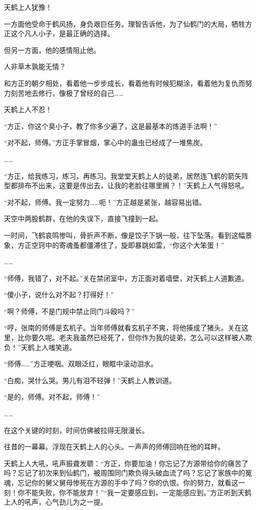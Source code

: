 
\begin{this_body}

天鹤上人犹豫！

一方面他受命于鹤风扬，身负艰巨任务。理智告诉他，为了仙鹤门的大局，牺牲方正这个凡人小子，是最正确的选择。

但另一方面，他的感情阻止他。

人非草木孰能无情？

和方正的朝夕相处，看着他一步步成长，看着他有时候犯糊涂，看着他为复仇而努力刻苦地去修行，像极了曾经的自己……

天鹤上人不忍！

“方正，你这个臭小子，教了你多少遍了，这是最基本的炼道手法啊！”

“对不起，师傅。”方正手掌冒烟，掌心中的蛊虫已经成了一堆焦炭。

……

“方正，给我练习，练习，再练习。我堂堂天鹤上人的徒弟，居然连飞鹤的箭矢阵型都排布不出来，这要是传出去，让我的老脸往哪里搁？！”天鹤上人气得怒吼。

“对不起，师傅。我一定努力……呃！”方正越是紧张，越容易出错。

天空中两股鹤群，在他的失误下，直接飞撞到一起。

一时间，飞鹤哀鸣惨叫，骨折声不断，像是饺子下锅一般，往下坠落。看到这幅景象，方正空窍中的寄魂蚤都僵滞住了，旋即暴跳如雷，“你这个大笨蛋！”

……

“师傅，我错了，对不起。”关在禁闭室中，方正面对着墙壁，对天鹤上人道歉道。

“傻小子，说什么对不起？打得好！”

“啊？师傅，不是门规中禁止同门斗殴吗？”

“哼，张南的师傅是玄机子。当年师傅就看玄机子不爽，将他揍成了猪头。关在这里，比你要久呢。老夫我虽然已经死了，但你作为我的徒弟，怎么可以这样被人欺负！”天鹤上人嗤笑道。

“师傅……”方正哽咽。双眼泛红，眼眶中滚动泪水。

“白痴，哭什么哭。男儿有泪不轻弹！”天鹤上人教训道。

“是的，师傅。对不起，师傅！”

……

在这个关键的时刻，时间仿佛被拉得无限漫长。

往昔的一幕幕。浮现在天鹤上人的心头。一声声的师傅回响在他的耳畔。

天鹤上人大吼，吼声振聋发聩：“方正，你要加油！你忘记了方源带给你的痛苦了吗？忘记了初次来到仙鹤门，被周围同门欺负得头破血流了吗？忘记了家族中的冤魂，忘记你的舅父舅母惨死在方源的手中了吗？你的仇恨。你的努力，就看这一刻！你不能失败，你不能放弃！”“我一定要感应到，一定能感应到。”方正听到天鹤上人的吼声，心气劲儿为之一提。


\end{this_body}
